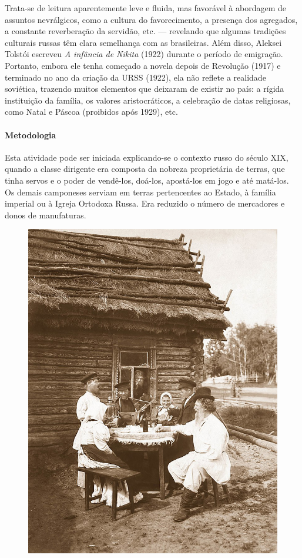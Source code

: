 \documentclass{article}
\begin{document}
Trata-se de leitura aparentemente leve e fluida, mas favorável à
abordagem de assuntos nevrálgicos, como a cultura do favorecimento, a
presença dos agregados, a constante reverberação da servidão, etc. ---
revelando que algumas tradições culturais russas têm clara semelhança
com as brasileiras. Além disso, Aleksei Tolstói escreveu \emph{A
infância de Nikita} (1922) durante o período de emigração. Portanto,
embora ele tenha começado a novela depois de Revolução (1917) e
terminado no ano da criação da URSS (1922), ela não reflete a realidade
soviética, trazendo muitos elementos que deixaram de existir no país: a
rígida instituição da família, os valores aristocráticos, a celebração
de datas religiosas, como Natal e Páscoa (proibidos após 1929), etc.

\paragraph{Metodologia}
Esta atividade pode ser iniciada explicando-se o contexto russo do
século XIX, quando a classe dirigente era composta da nobreza
proprietária de terras, que tinha servos e o poder de vendê-los,
doá-los, apostá-los em jogo e até matá-los. Os demais camponeses serviam
em terras pertencentes ao Estado, à família imperial ou à Igreja
Ortodoxa Russa. Era reduzido o número de mercadores e donos de
manufaturas.

\begin{figure}[ht!]
\includegraphics[width=\textwidth]{./images/PNLD0049-12.png}
\end{figure}
\end{document}
